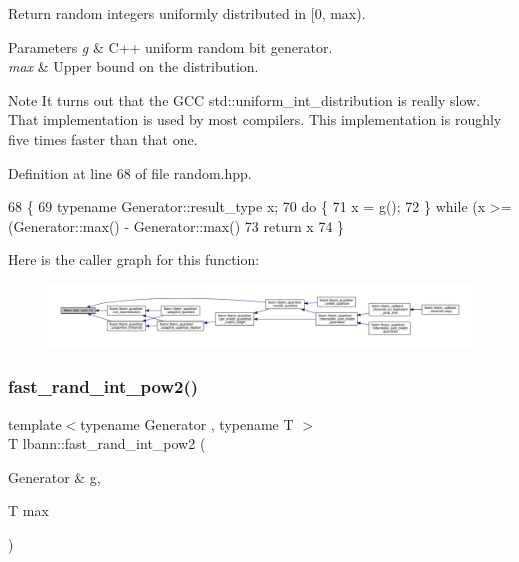 Return random integers uniformly distributed in \mbox{[}0, max). 
\begin{DoxyParams}{Parameters}
{\em g} & C++ uniform random bit generator. \\
\hline
{\em max} & Upper bound on the distribution. \\
\hline
\end{DoxyParams}
\begin{DoxyNote}{Note}
It turns out that the G\+CC std\+::uniform\+\_\+int\+\_\+distribution is really slow. That implementation is used by most compilers. This implementation is roughly five times faster than that one. 
\end{DoxyNote}


Definition at line 68 of file random.\+hpp.


\begin{DoxyCode}
68                                             \{
69   \textcolor{keyword}{typename} Generator::result\_type x;
70   \textcolor{keywordflow}{do} \{
71     x = g();
72   \} \textcolor{keywordflow}{while} (x >= (Generator::max() - Generator::max() %
73   \textcolor{keywordflow}{return} x %
74 \}
\end{DoxyCode}
Here is the caller graph for this function\+:\nopagebreak
\begin{figure}[H]
\begin{center}
\leavevmode
\includegraphics[width=350pt]{namespacelbann_a557aaed6267e7aaf583a75149e9c670c_icgraph}
\end{center}
\end{figure}
\mbox{\label{namespacelbann_a2fe8cea17a147566b73260f557b51006}} 
\subsubsection{\texorpdfstring{fast\+\_\+rand\+\_\+int\+\_\+pow2()}{fast\_rand\_int\_pow2()}}
{\footnotesize\ttfamily template$<$typename Generator , typename T $>$ \\
T lbann\+::fast\+\_\+rand\+\_\+int\+\_\+pow2 (\begin{DoxyParamCaption}\item[{Generator \&}]{g,  }\item[{T}]{max }\end{DoxyParamCaption})\hspace{0.3cm}{\ttfamily [inline]}}


